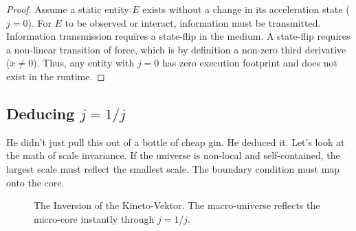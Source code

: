 \documentclass[11pt,a4paper]{article}
\begin{document}
\begin{proof}
Assume a static entity $E$ exists without a change in its acceleration state ($j = 0$). For $E$ to be observed or interact, information must be transmitted. Information transmission requires a state-flip in the medium. A state-flip requires a non-linear transition of force, which is by definition a non-zero third derivative ($\dddot{x} \neq 0$). Thus, any entity with $j = 0$ has zero execution footprint and does not exist in the runtime.
\end{proof}

\subsection{Deducing $j = 1/j$}
He didn't just pull this out of a bottle of cheap gin. He deduced it. Let's look at the math of scale invariance. If the universe is non-local and self-contained, the largest scale must reflect the smallest scale. The boundary condition must map onto the core. 

\begin{figure}[h!]
\centering
{}
\caption{The Inversion of the Kineto-Vektor. The macro-universe reflects the micro-core instantly through $j = 1/j$.}
\end{figure}
\end{document}
